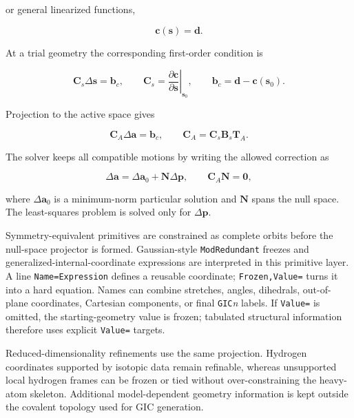\documentclass[journal=jctcce,manuscript=article,maxauthors=999]{achemso}
\begin{document}
or general linearized functions,

\begin{equation}
\mathbf{c}(\mathbf{s})=\mathbf{d}.
\end{equation}

At a trial geometry the corresponding first-order condition is

\begin{equation}
\mathbf{C}_s
\Delta\mathbf{s}
=
\mathbf{b}_c,
\qquad
\mathbf{C}_s =
\left.
\frac{\partial\mathbf{c}}
{\partial\mathbf{s}}
\right|_{\mathbf{s}_0},
\qquad
\mathbf{b}_c=\mathbf{d}-\mathbf{c}(\mathbf{s}_0).
\end{equation}

Projection to the active space gives

\begin{equation}
\mathbf{C}_{A}
\Delta\mathbf{a}
=
\mathbf{b}_c,
\qquad
\mathbf{C}_{A}
=
\mathbf{C}_s
\mathbf{B}_s
\mathbf{T}_{A}.
\end{equation}

The solver keeps all compatible motions by writing the allowed correction as

\begin{equation}
\Delta\mathbf{a}
=
\Delta\mathbf{a}_0
+
\mathbf{N}\Delta\mathbf{p},
\qquad
\mathbf{C}_{A}\mathbf{N}=\mathbf{0},
\end{equation}

where $\Delta\mathbf{a}_0$ is a minimum-norm particular solution and
$\mathbf{N}$ spans the null space. The least-squares problem is solved only
for $\Delta\mathbf{p}$.

Symmetry-equivalent primitives are constrained as complete orbits before the
null-space projector is formed. Gaussian-style \texttt{ModRedundant} freezes
and generalized-internal-coordinate expressions are interpreted in this
primitive layer. A line \texttt{Name=Expression} defines a reusable coordinate;
\texttt{Frozen,Value=} turns it into a hard equation. Names can combine
stretches, angles, dihedrals, out-of-plane coordinates, Cartesian components,
or final \texttt{GIC}\emph{n} labels. If \texttt{Value=} is omitted, the
starting-geometry value is frozen; tabulated structural information therefore
uses explicit \texttt{Value=} targets.

Reduced-dimensionality refinements use the same projection. Hydrogen
coordinates supported by isotopic data remain refinable, whereas unsupported
local hydrogen frames can be frozen or tied without over-constraining the
heavy-atom skeleton. Additional model-dependent geometry information is kept
outside the covalent topology used for GIC generation.
\end{document}
